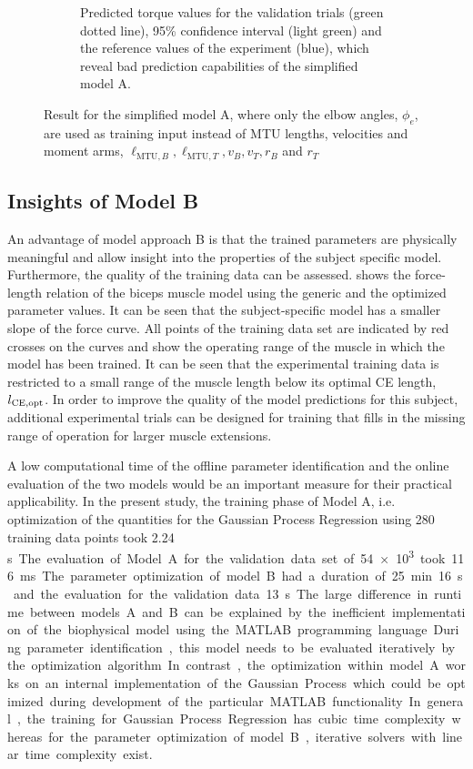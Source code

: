 \begin{figure}
\begin{subfigure}[t]{0.48\textwidth}
    \caption{Predicted torque values for the validation trials (green dotted line), 95\% confidence interval (light green) and the reference values of the experiment (blue), which reveal bad prediction capabilities of the simplified model A.}%
    \label{fig:measured_optimized_torque_A3}%
  \end{subfigure}%
  \caption{Result for the simplified model A, where only the elbow angles, $\phi_e$, are used as training input instead of MTU lengths, velocities and moment arms, $\ell_{\text{MTU},B}, \ell_{\text{MTU},T}, v_B, v_T, r_{B}$ and $r_{T}$}%
  \label{fig:measured_optimized_A2}%
\end{figure}%

\subsection{Insights of Model B}\label{ref:res_insights_b}
An advantage of model approach B is that the trained parameters are physically meaningful and allow insight into the properties of the subject specific model. Furthermore, the quality of the training data can be assessed.  shows the force-length relation of the biceps muscle model using the generic and the optimized parameter values. It can be seen that the subject-specific model has a smaller slope of the force curve. 
All points of the training data set are indicated by red crosses on the curves and show the operating range of the muscle in which the model has been trained. It can be seen that the experimental training data is restricted to a small range of the muscle length below its optimal CE length, $l_{\text{CE},\text{opt}}$. In order to improve the quality of the model predictions for this subject, additional experimental trials can be designed for training that fills in the missing  range of operation for larger muscle extensions.

A low computational time of the offline parameter identification and the online evaluation of the two models would be an important measure for their practical applicability. In the present study, the training phase of Model A, i.e. optimization of the quantities for the Gaussian Process Regression using 280 training data points took 2.24 \si\second. The evaluation of Model A for the validation data set of \num{54e3} took 116 \si{\milli\second}.
The parameter optimization of model B had a duration of 25\si\minute 16\si\second and the evaluation for the validation data 13 \si\second.

The large difference in runtime between models A and B can be explained by the inefficient implementation of the biophysical model using the MATLAB programming language. During parameter identification, this model needs to be evaluated iteratively by the optimization algorithm. In contrast, the optimization within model A works on an internal implementation of the Gaussian Process which could be optimized during development of the particular MATLAB functionality.
In general, the training for Gaussian Process Regression has cubic time complexity whereas for the parameter optimization of model B, iterative solvers with linear time complexity exist.

